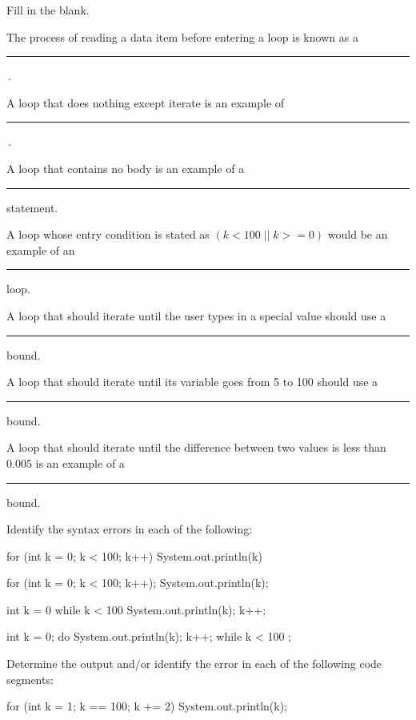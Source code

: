 \begin{EXRtwo}
\item  Fill in the blank.
\begin{EXRtwoLL}\baselineskip=14pt
\item  The process of reading a data item before entering a loop is
known as a  \rule{30pt}{0.5pt}\,.
\item  A loop that does nothing except iterate is an example of \rule{40pt}{0.5pt}\,.
\item  A loop that contains no body is an example of a \rule{40pt}{0.5pt} statement.
\item  A loop whose entry condition is stated as $( k < 100\; ||\; k >= 0)$
would be an example of an \rule{40pt}{0.5pt} loop.
\item  A loop that should iterate until the user types in a special value
should use a  \rule{40pt}{0.5pt} bound.
\item  A loop that should iterate until its variable goes from 5 to 100
should use a  \rule{40pt}{0.5pt} bound.
\item  A loop that should iterate until the difference between two
values is less than 0.005 is an example of a \rule{40pt}{0.5pt} bound.
\end{EXRtwoLL}\baselineskip=11pt


\item  Identify the syntax errors in each of the following:
\begin{EXRtwoLL}
\item

for (int k = 0; k < 100; k++)
    System.out.println(k)


\item

for (int k = 0; k < 100; k++);
    System.out.println(k);


\item

int k = 0
while  k < 100
{
   System.out.println(k);  k++;
}


\item

int k = 0;
do
{
   System.out.println(k);  k++;
}
while  k < 100 ;

\end{EXRtwoLL}

\item  Determine the output and/or identify the error in
each of the following code segments:
\begin{EXRtwoLL}
\item

for (int k = 1; k == 100; k += 2)
    System.out.println(k);



\end{EXRtwoLL}
\end{EXRtwo}

